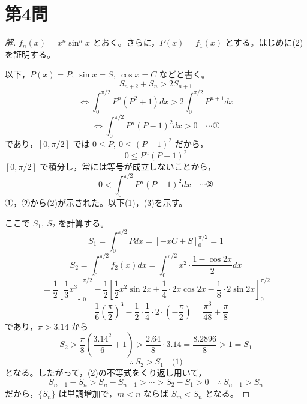 \documentclass[../main.tex]{subfiles}
\begin{document}
\newpage

\section*{第4問}

\begin{proof}[解]
  $f_n(x)=x^n\sin^nx$ とおく。さらに，$P(x)=f_1(x)$ とする。はじめに(2)を証明する。

  以下，$P(x)=P,\ \sin x=S,\ \cos x=C$ などと書く。
  \[
    S_{n+2}+S_n>2S_{n+1}
  \]
  \[
    \iff \int_0^{\pi/2}P^n(P^2+1)dx>2\int_0^{\pi/2}P^{n+1}dx
  \]
  \[
    \iff \int_0^{\pi/2}P^n(P-1)^2dx>0 \quad \cdots \text{①}
  \]
  であり，$[0,\pi/2]$ では $0\le P,\ 0\le(P-1)^2$ だから，
  \[
    0\le P^n(P-1)^2
  \]
  $[0,\pi/2]$ で積分し，常には等号が成立しないことから，
  \[
    0<\int_0^{\pi/2}P^n(P-1)^2dx \quad \cdots \text{②}
  \]
  ①，②から(2)が示された。以下(1)，(3)を示す。

  ここで $S_1,\ S_2$ を計算する。
  \[
    S_1=\int_0^{\pi/2}Pdx=\left[-xC+S\right]_0^{\pi/2}=1
  \]
  \[
    S_2=\int_0^{\pi/2}f_2(x)dx=\int_0^{\pi/2}x^2\cdot\frac{1-\cos2x}{2}dx
  \]
  \[
    =\frac12\left[\frac13x^3\right]_0^{\pi/2}-\frac12\left[\frac12x^2\sin2x+\frac14\cdot2x\cos2x-\frac18\cdot2\sin2x\right]_0^{\pi/2}
  \]
  \[
    =\frac16\left(\frac{\pi}{2}\right)^3-\frac12\cdot\frac14\cdot2\cdot\left(-\frac{\pi}{2}\right)=\frac{\pi^3}{48}+\frac{\pi}{8}
  \]
  であり，$\pi>3.14$ から
  \[
    S_2>\frac{\pi}{8}\left(\frac{3.14^2}{6}+1\right)>\frac{2.64}{8}\cdot3.14=\frac{8.2896}{8}>1=S_1
  \]
  \[
    \therefore\ S_2>S_1 \quad \text{(1)}
  \]
  となる。したがって，(2)の不等式をくり返し用いて，
  \[
    S_{n+1}-S_n>S_n-S_{n-1}>\cdots>S_2-S_1>0 \quad\therefore\ S_{n+1}>S_n
  \]
  だから，$\{S_n\}$ は単調増加で，$m<n$ ならば $S_m<S_n$ となる。 
\end{proof}
\end{document}
